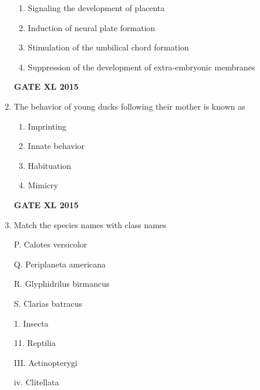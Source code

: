 \documentclass[journal,12pt,onecolumn]{IEEEtran}
\begin{document}
\begin{enumerate}
\begin{enumerate}
            \item Signaling the development of placenta
	    \item  Induction of neural plate formation
	    \item Stimulation of the umbilical chord formation
            \item Suppression of the development of extra-embryonic membranes
    \end{enumerate}
\hfill{\textbf{GATE XL 2015}}
\item  The behavior of young ducks following their mother is known as
    \begin{enumerate}
            \item Imprinting
	    \item Innate behavior
	    \item Habituation
            \item Mimicry
    \end{enumerate}
\hfill{\textbf{GATE XL 2015}}
\item Match the species names with class names

	\begin{minipage}{0.5\textwidth}
		\begin{flushleft}
P. Calotes versicolor

Q. Periplaneta americana

R. Glyphidrilus birmancus

S. Clarias batracus

	\end{flushleft}
	\end{minipage}
	\begin{minipage}{0.5\textwidth}\begin{flushleft}
1. Insecta

11. Reptilia

III. Actinopterygi

iv. Clitellata


\end{flushleft}
\end{minipage}
\end{enumerate}
\end{document}
